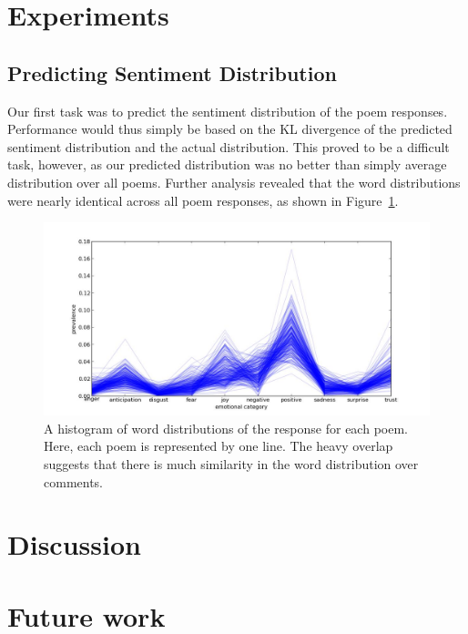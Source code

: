 \documentclass[11pt]{article}
\begin{document}
\section{Experiments}

\subsection{Predicting Sentiment Distribution}
Our first task was to predict the sentiment distribution of the poem responses. Performance would thus simply be based on the KL divergence of the predicted sentiment distribution and the actual distribution. This proved to be a difficult task, however, as our predicted distribution was no better than simply average distribution over all poems. Further analysis revealed that the word distributions were nearly identical across all poem responses, as shown in Figure~\ref{histogram}.

\begin{figure}[ht]
\begin{center}
\includegraphics[scale=0.4]{../experiments/exp10.jpg}
\end{center}
\caption{A histogram of word distributions of the response for each poem. Here, each poem is represented by one line. The heavy overlap suggests that there is much similarity in the word distribution over comments.}
\label{histogram}
\end{figure}

\section{Discussion}



\section{Future work}
\end{document}
